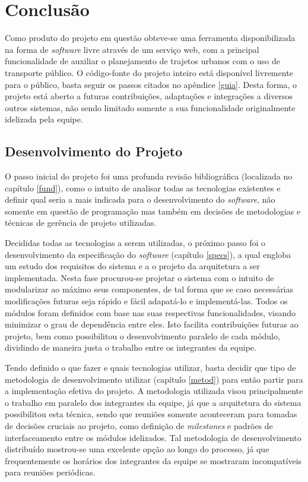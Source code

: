 \chapter{Conclusão}

Como produto do projeto em questão obteve-se uma ferramenta disponibilizada na forma de \emph{software} livre através de um serviço web, com a principal funcionalidade de auxiliar o planejamento de trajetos urbanos com o uso de transporte público.
O código-fonte do projeto inteiro está disponível livremente para o público, basta seguir os passos citados no apêndice \ref{guia}.
Desta forma, o projeto está aberto a futuras contribuições, adaptações e integrações a diversos outros sistemas, não sendo limitado somente a sua funcionalidade originalmente idelizada pela equipe.

\section{Desenvolvimento do Projeto}
O passo inicial do projeto foi uma profunda revisão bibliográfica (localizada no capítulo \ref{fund}), como o intuito de analisar todas as tecnologias existentes e definir qual seria a mais indicada para o desenvolvimento do \emph{software}, não somente em questão de programação mas também em decisões de metodologias e técnicas de gerência de projeto utilizadas.

Decididas todas as tecnologias a serem utilizadas, o próximo passo foi o desenvolvimento da especificação do \emph{software} (capítulo \ref{specs}), a qual engloba um estudo dos requisitos do sistema e a o projeto da arquitetura a ser implementada.
Nesta fase procurou-se projetar o sistema com o intuito de modularizar ao máximo seus componentes, de tal forma que se caso necessárias modificações futuras seja rápido e fácil adapatá-lo e implementá-las.
Todos os módulos foram definidos com base nas suas respectivas funcionalidades, visando minimizar o grau de dependência entre eles. 
Isto facilita contribuições futuras ao projeto, bem como possibilitou o desenvolvimento paralelo de cada módulo, dividindo de maneira justa o trabalho entre os integrantes da equipe.

Tendo definido o que fazer e quais tecnologias utilizar, basta decidir que tipo de metodologia de desenvolvimento utilizar (capítulo \ref{metod}) para então partir para a implementação efetiva do projeto. 
A metodologia utilizada visou principalmente o trabalho em paralelo dos integrantes da equipe, já que a arquitetura do sistema possibilitou esta técnica, sendo que reuniões somente aconteceram para tomadas de decisões cruciais ao projeto, como definição de \emph{milestones} e padrões de interfaceamento entre os módulos idelizados.
Tal metodologia de desenvolvimento distribuído mostrou-se uma excelente opção ao longo do processo, já que frequentemente os horários dos integrantes da equipe se mostraram incompatíveis para reuniões periódicas.

